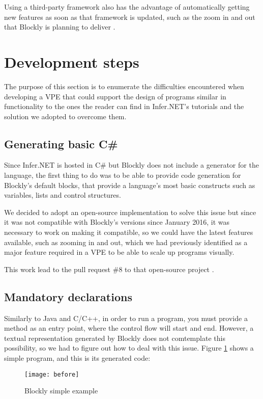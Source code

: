 Using a third-party framework also has the advantage of automatically getting new
features as soon as that framework is updated, such as the zoom in and out that
Blockly is planning to deliver \cite{blockly}.

\section{Development steps}

The purpose of this section is to enumerate the difficulties encountered when
developing a VPE that could support the design of programs similar in functionality
to the ones the reader can find in Infer.NET's tutorials \cite{InferNET14t} and
the solution we adopted to overcome them.

\subsection{Generating basic C#}

Since Infer.NET is hosted in C# but Blockly does not include a generator for
the language, the first thing to do was to be able to provide code generation for
Blockly's default blocks, that provide a language's most basic constructs such
as variables, lists and control structures.

We decided to adopt an open-source implementation to solve this issue \cite{csgen}
but since it was not compatible with Blockly's versions since January 2016, it
was necessary to work on making it compatible, so we could have the latest features
available, such as zooming in and out, which we had previously identified as a
major feature required in a VPE to be able to scale up programs visually.

This work lead to the pull request \#8 to that open-source project \cite{csgenpr}.

\subsection{Mandatory declarations}

Similarly to Java and C/C++, in order to run a program, you must provide a method
as an entry point, where the control flow will start and end. However, a textual
representation generated by Blockly does not comtemplate this possibility, so
we had to figure out how to deal with this issue. Figure \ref{fig:before} shows a simple program,
and this is its generated code:

\begin{figure}[t]
  \begin{center}
    \leavevmode
    \texttt{[image: before]}
    \caption{Blockly simple example}
    \label{fig:before}
  \end{center}
\end{figure}


